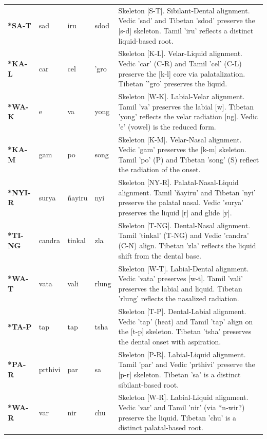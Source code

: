 \begin{longtable}{p{} p{} p{} p{} p{}}
\textbf{*SA-T} & sad & iru & sdod & \small Skeleton [S-T]. Sibilant-Dental alignment. Vedic 'sad' and Tibetan 'sdod' preserve the [s-d] skeleton. Tamil 'iru' reflects a distinct liquid-based root. \\ 
\addlinespace[10pt]
\textbf{*KA-L} & car & cel & ’gro & \small Skeleton [K-L]. Velar-Liquid alignment. Vedic 'car' (C-R) and Tamil 'cel' (C-L) preserve the [k-l] core via palatalization. Tibetan '’gro' preserves the liquid. \\ 
\addlinespace[10pt]
\textbf{*WA-K} & e & va & yong & \small Skeleton [W-K]. Labial-Velar alignment. Tamil 'va' preserves the labial [w]. Tibetan 'yong' reflects the velar radiation [ng]. Vedic 'e' (vowel) is the reduced form. \\ 
\addlinespace[10pt]
\textbf{*KA-M} & gam & po & song & \small Skeleton [K-M]. Velar-Nasal alignment. Vedic 'gam' preserves the [k-m] skeleton. Tamil 'po' (P) and Tibetan 'song' (S) reflect the radiation of the onset. \\ 
\addlinespace[10pt]
\textbf{*NYI-R} & surya & ñayiru & nyi & \small Skeleton [NY-R]. Palatal-Nasal-Liquid alignment. Tamil 'ñayiru' and Tibetan 'nyi' preserve the palatal nasal. Vedic 'surya' preserves the liquid [r] and glide [y]. \\ 
\addlinespace[10pt]
\textbf{*TI-NG} & candra & tinkal & zla & \small Skeleton [T-NG]. Dental-Nasal alignment. Tamil 'tinkal' (T-NG) and Vedic 'candra' (C-N) align. Tibetan 'zla' reflects the liquid shift from the dental base. \\ 
\addlinespace[10pt]
\textbf{*WA-T} & vata & vali & rlung & \small Skeleton [W-T]. Labial-Dental alignment. Vedic 'vata' preserves [w-t]. Tamil 'vali' preserves the labial and liquid. Tibetan 'rlung' reflects the nasalized radiation. \\ 
\addlinespace[10pt]
\textbf{*TA-P} & tap & tap & tsha & \small Skeleton [T-P]. Dental-Labial alignment. Vedic 'tap' (heat) and Tamil 'tap' align on the [t-p] skeleton. Tibetan 'tsha' preserves the dental onset with aspiration. \\ 
\addlinespace[10pt]
\textbf{*PA-R} & prthivi & par & sa & \small Skeleton [P-R]. Labial-Liquid alignment. Tamil 'par' and Vedic 'prthivi' preserve the [p-r] skeleton. Tibetan 'sa' is a distinct sibilant-based root. \\ 
\addlinespace[10pt]
\textbf{*WA-R} & var & nir & chu & \small Skeleton [W-R]. Labial-Liquid alignment. Vedic 'var' and Tamil 'nir' (via *n-wir?) preserve the liquid. Tibetan 'chu' is a distinct palatal-based root. \\ 

\end{longtable}
